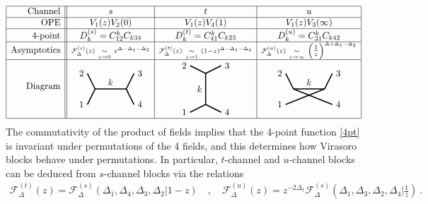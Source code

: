 \documentclass[12pt, a4paper]{article}
\theoremstyle{break}
\begin{document}
\begin{align}
 \begin{array}{|r||c|c|c|}
  \hline 
  \text{Channel} & s & t & u
  \\ \hline
  \text{OPE} & V_1(z)V_2(0) & V_1(z)V_4(1) & V_1(z)V_3(\infty)
  \\ \hline 
  \text{4-point} & D^{(s)}_k = C_{12}^k C_{k34} & D^{(t)}_k = C_{41}^k C_{k23} & D^{(u)}_k = C_{31}^k C_{k42}
\\ \hline 
  \text{Asymptotics} & {\scriptstyle \mathcal{F}^{(s)}_{\Delta}(z)\ \underset{z\to 0}{\sim}\ z^{\Delta-\Delta_1-\Delta_2}} & {\scriptstyle\mathcal{F}^{(t)}_{\Delta}(z)\ \underset{z\to 1}{\sim}\ (1-z)^{\Delta-\Delta_1-\Delta_4}}
  & {\scriptstyle\mathcal{F}^{(u)}_\Delta(z)\  \underset{z\to \infty}{\sim}\ \left(\tfrac{1}{z}\right)^{\Delta+\Delta_1-\Delta_3}}
  \\
  \hline 
\text{Diagram} & 
\begin{tikzpicture}[baseline=(current  bounding  box.center), very thick, scale = .3]
\draw (-1,2) node [left] {$2$} -- (0,0) -- node [above] {$k$} (4,0) -- (5,2) node [right] {$3$};
\draw (-1,-2) node [left] {$1$} -- (0,0);
\draw (4,0) -- (5,-2) node [right] {$4$};
\end{tikzpicture}
& 
\begin{tikzpicture}[baseline=(current  bounding  box.center), very thick, scale = .3]
 \draw (-2,3) node [left] {$2$} -- (0,2) -- node [left] {$k$} (0,-2) -- (-2, -3) node [left] {$1$};
\draw (0,2) -- (2,3) node [right] {$3$};
\draw (0,-2) -- (2, -3) node [right] {$4$};
\end{tikzpicture}
& 
\begin{tikzpicture}[baseline=(current  bounding  box.center), very thick, scale = .3]
\draw (-1,2) node [left] {$2$} -- (0,0) -- node [above] {$k$} (4,0) -- (5,2) node [right] {$3$};
\draw (-1,-2) node [left] {$1$} -- (4,0);
\draw (0,0) -- (5,-2) node [right] {$4$};
\end{tikzpicture}
  \\
  \hline 
 \end{array}
 \label{stu}
\end{align}
The commutativity of the product of fields implies that the 4-point function \eqref{4pt} is invariant under permutations of the 4 fields, and this determines how Virasoro blocks behave under permutations. In particular, $t$-channel and $u$-channel blocks can be deduced from $s$-channel blocks via the relations 
\begin{align}
 \mathcal{F}^{(t)}_\Delta(z) = \mathcal{F}^{(s)}_\Delta(\Delta_1,\Delta_4,\Delta_3,\Delta_2|1-z) \quad , \quad 
 \mathcal{F}^{(u)}_\Delta(z) = z^{-2\Delta_1}\mathcal{F}^{(s)}_\Delta(\Delta_1,\Delta_3,\Delta_2,\Delta_4|\tfrac{1}{z})\ .
 \label{stotu}
\end{align}
\end{document}
